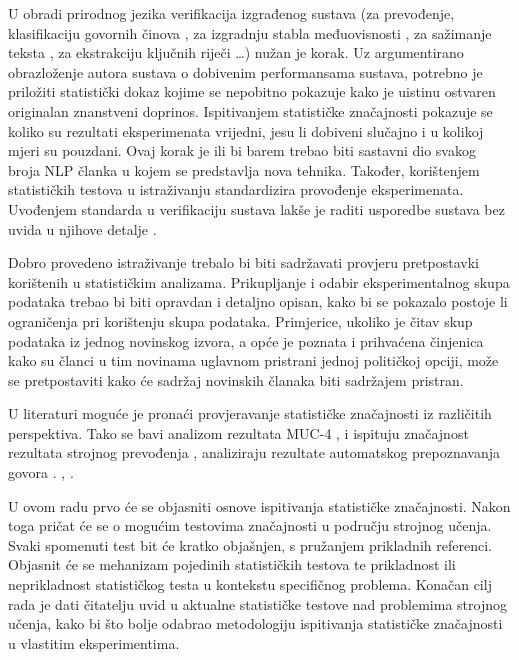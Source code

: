 U obradi prirodnog jezika  verifikacija izgrađenog sustava (za prevođenje, klasifikaciju govornih činova  \citep{pratt1977toward}, za izgradnju stabla međuovisnosti  \citep{collins2003head}, za sažimanje teksta , za ekstrakciju ključnih riječi  \dots) nužan je korak. Uz argumentirano obrazloženje autora sustava o dobivenim performansama sustava, potrebno je priložiti statistički dokaz kojime se nepobitno pokazuje kako je uistinu ostvaren originalan znanstveni doprinos. Ispitivanjem statističke značajnosti pokazuje se koliko su rezultati eksperimenata vrijedni, jesu li dobiveni slučajno i u kolikoj mjeri su pouzdani. Ovaj korak je ili bi barem trebao biti sastavni dio svakog broja NLP članka u kojem se predstavlja nova tehnika. Također, korištenjem statističkih testova u istraživanju standardizira provođenje eksperimenata. Uvođenjem standarda u verifikaciju sustava lakše je raditi usporedbe sustava bez uvida u njihove detalje .

Dobro provedeno istraživanje trebalo bi biti sadržavati provjeru pretpostavki korištenih u statističkim analizama. Prikupljanje i odabir eksperimentalnog skupa podataka trebao bi biti opravdan i detaljno opisan, kako bi se pokazalo postoje li ograničenja pri korištenju skupa podataka. Primjerice, ukoliko je čitav skup podataka iz jednog novinskog izvora, a opće je poznata i prihvaćena činjenica kako su članci u tim novinama uglavnom pristrani jednoj političkoj opciji, može se pretpostaviti kako će sadržaj novinskih članaka biti sadržajem pristran. 

U literaturi moguće je pronaći provjeravanje statističke značajnosti iz različitih perspektiva. Tako se \citep{chinchor1992statistical} bavi analizom rezultata MUC-4 , \citep{koehn2004statistical} i \citep{zhang2004interpreting} ispituju značajnost rezultata strojnog prevođenja , \citep{bisani2004bootstrap} analiziraju rezultate automatskog prepoznavanja govora . \citep{berg2012empirical}, \citep{yeh2000more}.

U ovom radu prvo će se objasniti osnove ispitivanja statističke značajnosti. Nakon toga pričat će se o mogućim testovima značajnosti u području strojnog učenja. Svaki spomenuti test bit će kratko objašnjen, s pružanjem prikladnih referenci. Objasnit će se mehanizam pojedinih statističkih testova te prikladnost ili neprikladnost statističkog testa u kontekstu specifičnog problema. Konačan cilj rada je dati čitatelju uvid u aktualne statističke testove nad problemima strojnog učenja, kako bi što bolje odabrao metodologiju ispitivanja statističke značajnosti u vlastitim eksperimentima.